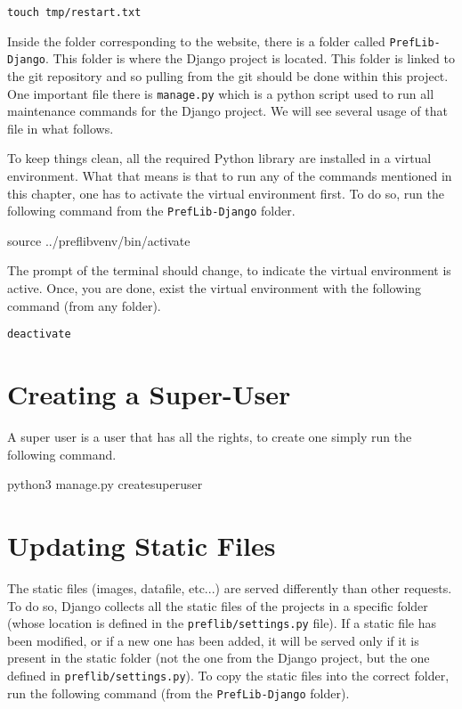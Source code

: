 \documentclass{report}
\begin{document}
	\begin{center}
		\texttt{touch tmp/restart.txt}
	\end{center}

	Inside the folder corresponding to the website, there is a folder called \texttt{PrefLib-Django}. This folder is where the Django project is located. This folder is linked to the git repository and so pulling from the git should be done within this project. One important file there is \texttt{manage.py} which is a python script used to run all maintenance commands for the Django project. We will see several usage of that file in what follows.
	
	To keep things clean, all the required Python library are installed in a virtual environment. What that means is that to run any of the commands mentioned in this chapter, one has to activate the virtual environment first. To do so, run the following command from the \texttt{PrefLib-Django} folder.
	
	\begin{center}
		source ../preflibvenv/bin/activate
	\end{center}

	\noindent The prompt of the terminal should change, to indicate the virtual environment is active. Once, you are done, exist the virtual environment with the following command (from any folder).
	
	\begin{center}
		\texttt{deactivate}
	\end{center}
	
	\section{Creating a Super-User}
	
	A super user is a user that has all the rights, to create one simply run the following command.
	
	\begin{center}
		python3 manage.py createsuperuser
	\end{center}
	
	\section{Updating Static Files}
	
	The static files (images, datafile, etc...) are served differently than other requests. To do so, Django collects all the static files of the projects in a specific folder (whose location is defined in the \texttt{preflib/settings.py} file). If a static file has been modified, or if a new one has been added, it will be served only if it is present in the static folder (not the one from the Django project, but the one defined in \texttt{preflib/settings.py}). To copy the static files into the correct folder, run the following command (from the \texttt{PrefLib-Django} folder).
	
\end{document}

